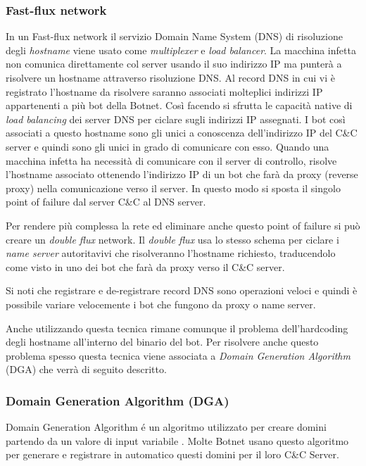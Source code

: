 \subsubsection{Fast-flux network}
\label{fast-flux-network-label}
In un Fast-flux network il servizio Domain Name System (DNS) di risoluzione degli \textit{hostname} viene usato come \textit{multiplexer} e \textit{load balancer}. La macchina infetta non comunica direttamente col server usando il suo indirizzo IP ma punterà a risolvere un hostname attraverso risoluzione DNS. Al record DNS in cui vi è registrato l'hostname da risolvere saranno associati molteplici indirizzi IP appartenenti a più bot della Botnet. Così facendo si sfrutta le capacità native di \textit{load balancing} dei server DNS per ciclare sugli indirizzi IP assegnati. I bot così associati a questo hostname sono gli unici a conoscenza dell'indirizzo IP del C\&C server e quindi sono gli unici in grado di comunicare con esso. 
Quando una macchina infetta ha necessità di comunicare con il server di controllo, risolve l'hostname associato ottenendo l'indirizzo IP di un bot che farà da proxy (reverse proxy) nella comunicazione verso il server.
In questo modo  si sposta il singolo point of failure dal server C\&C al DNS server.

Per rendere più complessa la rete ed eliminare anche questo point of failure si può creare un  \emph{double flux} network. Il \emph{double flux} usa lo stesso schema per ciclare i \textit{name server} autoritavivi che risolveranno l'hostname richiesto, traducendolo come visto in uno dei bot che farà da proxy verso il C\&C server. 

Si noti che registrare e de-registrare record DNS sono operazioni veloci e quindi è possibile variare velocemente i bot che fungono da proxy o name server.

Anche utilizzando questa tecnica rimane comunque il problema dell'hardcoding degli hostname all'interno del binario del bot. Per risolvere anche questo problema spesso  questa tecnica viene associata a \emph{Domain Generation Algorithm} (DGA) che verrà di seguito descritto.

\subsubsection{Domain Generation Algorithm (DGA)}
\label{DGA}
Domain Generation Algorithm é un algoritmo utilizzato per creare domini partendo da un valore di input variabile \cite{inproceedings}. Molte Botnet usano questo algoritmo per generare e registrare in automatico questi domini per il loro C\&C Server.

